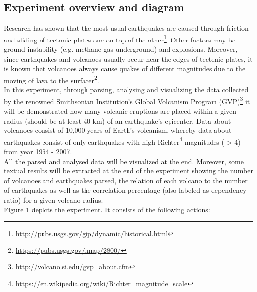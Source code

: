 \documentclass[12pt, a4paper]{article}
\begin{document}
\subsection{Experiment overview and diagram}
Research has shown that the most usual earthquakes are caused through friction and sliding of tectonic plates one on top of the other\footnote{\url{http://pubs.usgs.gov/gip/dynamic/historical.html}}. Other factors may be ground instability (e.g. methane gas underground) and explosions. Moreover, since earthquakes and volcanoes usually occur near the edges of tectonic plates, it is known that volcanoes always cause quakes of different magnitudes due to the moving of lava to the surfacer\footnote{\url{https://pubs.usgs.gov/imap/2800/}}.\\
In this experiment, through parsing, analysing and visualizing the data collected by the renowned Smithsonian Institution's Global Volcanism Program (GVP)\footnote{\url{http://volcano.si.edu/gvp_about.cfm}} it will be demonstrated how many volcanic eruptions are placed within a given radius (should be at least 40 km) of an earthquake’s epicenter. Data about volcanoes consist of 10,000 years of Earth's volcanism, whereby data about earthquakes consist of only earthquakes with high Richter\footnote{\url{https://en.wikipedia.org/wiki/Richter_magnitude_scale}} magnitudes ( > 4)  from year 1964 - 2007.\\
All the parsed and analysed data will be visualized at the end. Moreover, some textual results will be extracted at the end of the experiment showing the number of volcanoes and earthquakes parsed, the relation of each volcano to the number of earthquakes as well as the correlation percentage (also labeled as dependency ratio) for a given volcano radius.\\
\newline
Figure 1 depicts the experiment. It consists of the following actions:
\end{document}
